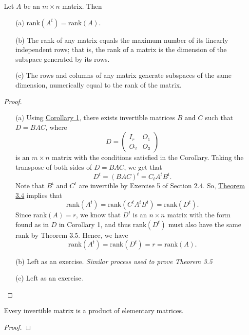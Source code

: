 \begin{corollary}\label{Corollary 2 to Theorem 3.6}
    Let \( A  \) be an \( m \times n  \) matrix. Then  
    \begin{enumerate}
        \item[(a)] \( \text{rank}(A^{t}) = \text{rank}(A) \).
        \item[(b)] The rank of any matrix equals the maximum number of its linearly independent rows; that is, the rank of a matrix is the dimension of the subspace generated by its rows.
        \item[(c)] The rows and columns of any matrix generate subspaces of the same dimension, numerically equal to the rank of the matrix.
    \end{enumerate}
\end{corollary}    
\begin{proof}
\begin{enumerate}
    \item[(a)] Using {\hyperref[Corollary 1 to Theorem 3.6]{Corollary 1}}, there exists invertible matrices \( B  \) and \( C  \) such that \( D = BAC \), where 
        \[  D = \begin{pmatrix} 
            {I}_{r} & {O}_{1} \\
            {O}_{2} & {O}_{3}
                  \end{pmatrix}  \] is an \( m \times n  \) matrix with the conditions satisfied in the Corollary. Taking the transpose of both sides of \( D = BAC \), we get that
                  \[  D^{t} = (BAC)^{t} = {C}_{t} A^{t} B^{t}. \]
                  Note that \( B^{t}  \) and \( C^{t} \) are invertible by Exercise 5 of Section 2.4. So, {\hyperref[Theorem 3.4]{Theorem 3.4}} implies that  
                  \[  \text{rank}(A^{t}) = \text{rank}(C^{t} A^{t} B^{t}) = \text{rank}(D^{t}). \]
                  Since \( \text{rank}(A) = r  \), we know that \( D^{t} \) is an \( n \times n  \) matrix with the form found as in \( D  \) in Corollary 1, and thus \( \text{rank}(D^{t})  \) must also have the same rank by Theorem 3.5. Hence, we have
                  \[  \text{rank}(A^{t}) = \text{rank}(D^{t}) = r = \text{rank}(A). \]
        \item[(b)] Left as an exercise. \textit{Similar process used to prove Theorem 3.5} 
        \item[(c)] Left as an exercise.
\end{enumerate}
\end{proof}

\begin{corollary}\label{Corollary 3 to Theorem 3.6}
   Every invertible matrix is a product of elementary matrices. 
\end{corollary}
\begin{proof}

\end{proof}

